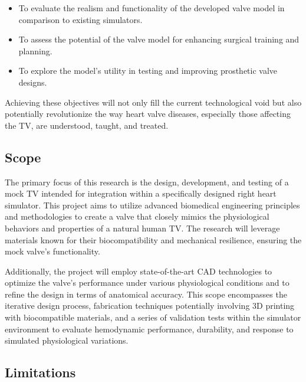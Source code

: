 
\begin{itemize}
    \item To evaluate the realism and functionality of the developed valve model in comparison to existing simulators.
    \item To assess the potential of the valve model for enhancing surgical training and planning.
    \item To explore the model's utility in testing and improving prosthetic valve designs.
\end{itemize}

Achieving these objectives will not only fill the current technological void but also potentially revolutionize the way heart valve diseases, especially those affecting the \gls{TV}, are understood, taught, and treated.

\subsection{Scope}

The primary focus of this research is the design, development, and testing of a mock \gls{TV} intended for integration within a specifically designed right heart simulator. This project aims to utilize advanced biomedical engineering principles and methodologies to create a valve that closely mimics the physiological behaviors and properties of a natural human \gls{TV}. The research will leverage materials known for their biocompatibility and mechanical resilience, ensuring the mock valve's functionality.

Additionally, the project will employ state-of-the-art CAD technologies to optimize the valve's performance under various physiological conditions and to refine the design in terms of anatomical accuracy. This scope encompasses the iterative design process, fabrication techniques potentially involving 3D printing with biocompatible materials,   and a series of validation tests within the simulator environment to evaluate hemodynamic performance, durability, and response to simulated physiological variations.

\subsection{Limitations}

